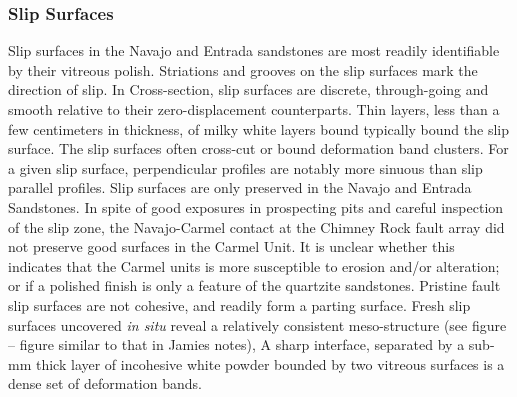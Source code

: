 \documentclass[12pt,a4paper]{article}
\begin{document}
\subsubsection{Slip Surfaces}

Slip surfaces in the Navajo and Entrada sandstones are most readily identifiable by their vitreous polish. Striations and grooves on the slip surfaces mark the direction of slip. In Cross-section, slip surfaces are discrete, through-going and smooth relative to their zero-displacement counterparts. Thin layers, less than a few centimeters in thickness, of milky white layers bound typically bound the slip surface. The slip surfaces often cross-cut or bound deformation band clusters. For a given slip surface, perpendicular profiles are notably more sinuous than slip parallel profiles. Slip surfaces are only preserved in the Navajo and Entrada Sandstones. In spite of good exposures in prospecting pits and careful inspection of the slip zone, the Navajo-Carmel contact at the Chimney Rock fault array did not preserve good surfaces in the Carmel Unit. It is unclear whether this indicates that the Carmel units is more susceptible to erosion and/or alteration; or if a polished finish is only a feature of the quartzite sandstones. Pristine fault slip surfaces are not cohesive, and readily form a parting surface. Fresh slip surfaces uncovered \textit{in situ} reveal a relatively consistent meso-structure (see figure – figure similar to that in Jamies notes), A sharp interface, separated by a sub-mm thick layer of incohesive white powder bounded by two vitreous surfaces is a dense set of deformation bands. 
\end{document}
